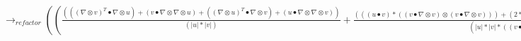 \documentclass{article}
\begin{document}
\\\newline $\rightarrow_{refactor}((\frac{((( \nabla  \otimes v)^T \bullet  \nabla  \otimes u)+(v \bullet  \nabla  \otimes  \nabla  \otimes u)+(( \nabla  \otimes u)^T \bullet  \nabla  \otimes v)+(u \bullet  \nabla  \otimes  \nabla  \otimes v))}{(|u|*|v|)}+\frac{(((u \bullet v)*((v \bullet  \nabla  \otimes v) \otimes (v \bullet  \nabla  \otimes v)))+(2*(u \bullet v)*((v \bullet  \nabla  \otimes v) \otimes (v \bullet  \nabla  \otimes v))))}{(|u|*|v|*((v \bullet v))^2)}+\frac{((u \bullet v)*((v \bullet  \nabla  \otimes v) \otimes (u \bullet  \nabla  \otimes u)))}{((u \bullet u)*|v|*|u|*(v \bullet v))}+\frac{((u \bullet v)*((u \bullet  \nabla  \otimes u) \otimes (v \bullet  \nabla  \otimes v)))}{(|u|*|v|*(u \bullet u)*(v \bullet v))}+\frac{((u \bullet v)*((u \bullet  \nabla  \otimes u) \otimes (u \bullet  \nabla  \otimes u)))}{(|u|*|v|*((u \bullet u))^2)}+\frac{(2*|u|*(u \bullet v)*((u \bullet  \nabla  \otimes u) \otimes (u \bullet  \nabla  \otimes u)))}{(|v|*(u \bullet u)*((u \bullet u))^2)})-(\frac{((((v \bullet  \nabla  \otimes u) \otimes (v \bullet  \nabla  \otimes v)))+(((u \bullet  \nabla  \otimes v) \otimes (v \bullet  \nabla  \otimes v))))}{(|u|*|v|*(v \bullet v))}+\frac{(((u \bullet  \nabla  \otimes v) \otimes (u \bullet  \nabla  \otimes u)))}{(|v|*|u|*(u \bullet u))}+\frac{((((v \bullet  \nabla  \otimes v) \otimes (u \bullet  \nabla  \otimes v)))+((u \bullet v)*(v \bullet  \nabla  \otimes  \nabla  \otimes v))+((u \bullet v)*(( \nabla  \otimes v)^T \bullet  \nabla  \otimes v))+(((v \bullet  \nabla  \otimes v) \otimes (v \bullet  \nabla  \otimes u))))}{(|v|*|u|*(v \bullet v))}+\frac{((((v \bullet  \nabla  \otimes u) \otimes (u \bullet  \nabla  \otimes u)))+(((u \bullet  \nabla  \otimes u) \otimes (v \bullet  \nabla  \otimes u)))+(((u \bullet  \nabla  \otimes u) \otimes (u \bullet  \nabla  \otimes v))))}{(|u|*|v|*(u \bullet u))}+\frac{((|u|*(u \bullet v)*(u \bullet  \nabla  \otimes  \nabla  \otimes u))+(|u|*(u \bullet v)*(( \nabla  \otimes u)^T \bullet  \nabla  \otimes u)))}{(|v|*(u \bullet u)*(u \bullet u))}))$
\end{document}
